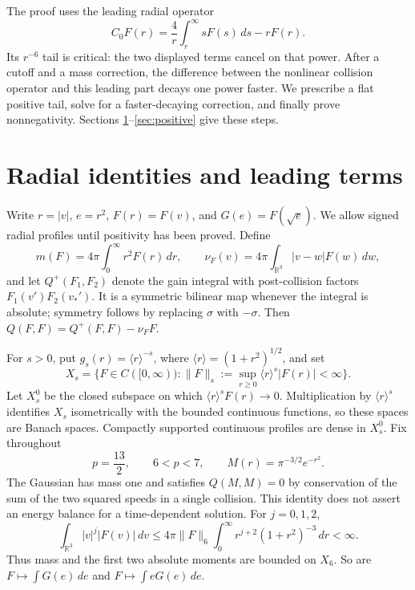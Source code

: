 \documentclass[11pt,a4paper]{article}
\numberwithin{equation}{section}
\theoremstyle{remark}
\newcommand{\R}{\mathbb R}
\newcommand{\la}[1]{\langle #1\rangle}
\newcommand{\dd}{\,d}
\newcommand{\norm}[2]{\lVert #1\rVert_{#2}}
\begin{document}
The proof uses the leading radial operator
\[
 C_0F(r)=\frac4r\int_r^\infty sF(s)\dd s-rF(r).
\]
Its \(r^{-6}\) tail is critical: the two displayed terms cancel on that
power. After a cutoff and a mass correction, the difference between the
nonlinear collision operator and this leading part decays one power
faster. We prescribe a flat positive tail, solve for a faster-decaying
correction, and finally prove nonnegativity. Sections
\ref{sec:radial}--\ref{sec:positive} give these steps.

\section{Radial identities and leading terms}\label{sec:radial}

Write \(r=|v|\), \(e=r^2\), \(F(r)=F(v)\), and
\(G(e)=F(\sqrt e)\). We allow signed radial profiles until positivity has
been proved. Define
\[
 m(F)=4\pi\int_0^\infty r^2F(r)\dd r,\qquad
 \nu_F(v)=4\pi\int_{\R^3}|v-w|F(w)\dd w,
\]
and let \(Q^+(F_1,F_2)\) denote the gain integral with post-collision
factors \(F_1(v')F_2(v_*')\). It is a symmetric bilinear map whenever the integral is
absolute; symmetry follows by replacing \(\sigma\) with \(-\sigma\).
Then \(Q(F,F)=Q^+(F,F)-\nu_FF\).

For \(s>0\), put \(g_s(r)=\la r^{-s}\), where
\(\la r=(1+r^2)^{1/2}\), and set
\[
 X_s=\{F\in C([0,\infty)):\norm{F}{s}
       :=\sup_{r\geq0}\la r^s|F(r)|<\infty\}.
\]
Let \(X_s^0\) be the closed subspace on which
\(\la r^sF(r)\to0\). Multiplication by \(\la r^s\) identifies \(X_s\)
isometrically with the bounded continuous functions, so these spaces are
Banach spaces. Compactly supported continuous profiles are dense in
\(X_s^0\). Fix throughout
\begin{equation}\label{eq:p}
 p=\frac{13}{2},\qquad 6<p<7,\qquad
 M(r)=\pi^{-3/2}e^{-r^2}.
\end{equation}
The Gaussian has mass one and satisfies \(Q(M,M)=0\) by conservation of
the sum of the two squared speeds in a single collision. This identity
does not assert an energy balance for a time-dependent solution.
For \(j=0,1,2\),
\[
 \int_{\R^3}|v|^j|F(v)|\dd v
 \leq4\pi\norm{F}{6}\int_0^\infty r^{j+2}(1+r^2)^{-3}\dd r<\infty.
\]
Thus mass and the first two absolute moments are bounded on \(X_6\).
So are \(F\mapsto\int G(e)\dd e\) and
\(F\mapsto\int eG(e)\dd e\).
\end{document}
